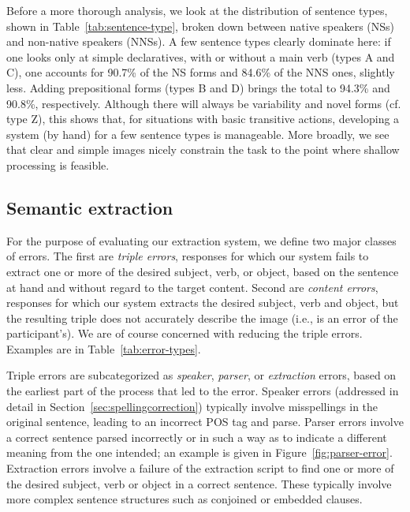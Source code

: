 Before a more thorough analysis, we look at the distribution of
sentence types, shown in Table~\ref{tab:sentence-type}, broken down
between native speakers (NSs) and non-native speakers (NNSs).  A few
sentence types clearly dominate here: if one looks only at simple
declaratives, with or without a main verb (types A and C), one
accounts for 90.7\% of the NS forms and 84.6\% of the NNS ones,
slightly less.  Adding prepositional forms (types B and D) brings the
total to 94.3\% and 90.8\%, respectively.  Although there will always
be variability and novel forms (cf. type Z), this shows that, for
situations with basic transitive actions, developing a system (by
hand) for a few sentence types is manageable.  More broadly, we see
that clear and simple images nicely constrain the task to the point
where shallow processing is feasible.

\subsection{Semantic extraction}
\label{sec:eval:extraction}

For the purpose of evaluating our extraction system, we define two
major classes of errors. The first are \textit{triple errors},
responses for which our system fails to extract one or more of the
desired subject, verb, or object, based on the sentence at hand and
without regard to the target content. Second are \textit{content
  errors}, responses for which our system extracts the desired
subject, verb and object, but the resulting triple does not accurately
describe the image (i.e., is an error of the participant's). We are of
course concerned with reducing the triple errors.  Examples are in
Table~\ref{tab:error-types}.

Triple errors are subcategorized as \textit{speaker}, \textit{parser},
or \textit{extraction} errors, based on the earliest part of the
process that led to the error. Speaker errors (addressed in detail in Section~\ref{sec:spellingcorrection}) typically involve
misspellings in the original sentence, leading to an incorrect POS tag
and parse. Parser errors involve a correct sentence parsed incorrectly
or in such a way as to indicate a different meaning from the one
intended; an example is given in
Figure~\ref{fig:parser-error}. Extraction errors involve a failure of
the extraction script to find one or more of the desired subject, verb
or object in a correct sentence. These typically involve more
complex sentence structures such as conjoined or embedded clauses.

